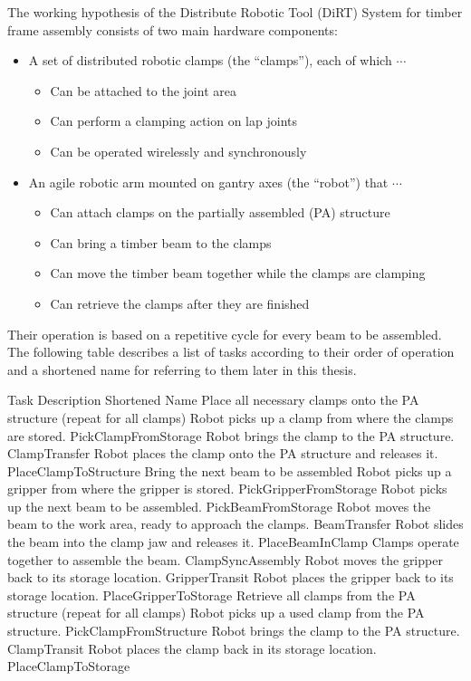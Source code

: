 The working hypothesis of the Distribute Robotic Tool (DiRT) System for timber frame assembly consists of two main hardware components:
\begin{itemize}
    \item A set of distributed robotic clamps (the “clamps”), each of which $\cdots$
    \begin{itemize}
        \item Can be attached to the joint area
        \item Can perform a clamping action on lap joints
        \item Can be operated wirelessly and synchronously
    \end{itemize}
    \item An agile robotic arm mounted on gantry axes (the “robot”) that $\cdots$
    \begin{itemize}
        \item Can attach clamps on the partially assembled (PA) structure
        \item Can bring a timber beam to the clamps
        \item Can move the timber beam together while the clamps are clamping
        \item Can retrieve the clamps after they are finished
    \end{itemize}
\end{itemize}

Their operation is based on a repetitive cycle for every beam to be assembled. The following table describes a list of tasks according to their order of operation and a shortened name for referring to them later in this thesis.

Task Description
Shortened Name
Place all necessary clamps onto the PA structure (repeat for all clamps)
Robot picks up a clamp from where the clamps are stored.
PickClampFromStorage
Robot brings the clamp to the PA structure.
ClampTransfer
Robot places the clamp onto the PA structure and releases it.
PlaceClampToStructure
Bring the next beam to be assembled
Robot picks up a gripper from where the gripper is stored.
PickGripperFromStorage
Robot picks up the next beam to be assembled.
PickBeamFromStorage
Robot moves the beam to the work area, ready to approach the clamps.
BeamTransfer
Robot slides the beam into the clamp jaw and releases it.
PlaceBeamInClamp
Clamps operate together to assemble the beam.
ClampSyncAssembly
Robot moves the gripper back to its storage location.
GripperTransit
Robot places the gripper back to its storage location.
PlaceGripperToStorage
Retrieve all clamps from the PA structure (repeat for all clamps)
Robot picks up a used clamp from the PA structure.
PickClampFromStructure
Robot brings the clamp to the PA structure.
ClampTransit
Robot places the clamp back in its storage location.
PlaceClampToStorage

